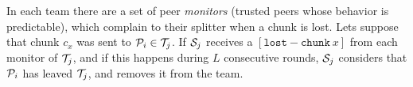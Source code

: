 In each team there are a set of peer \emph{monitors} (trusted peers
whose behavior is predictable), which complain to their splitter when
a chunk is lost. Lets suppose that chunk $c_x$ was sent to ${\cal
  P}_i\in {\cal T}_j$. If ${\cal S}_j$ receives a
$[\mathtt{lost-chunk}~x]$ from each monitor of ${\cal T}_j$, and if
this happens during $L$ consecutive rounds, ${\cal S}_j$ considers
that ${\cal P}_i$ has leaved ${\cal T}_j$, and removes it from the
team.
